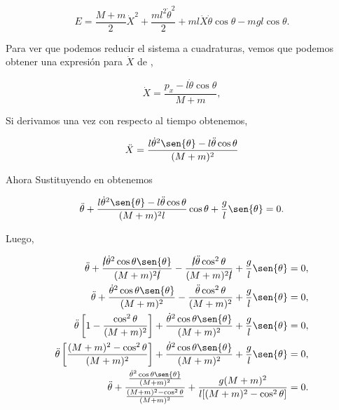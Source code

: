 \documentclass[a4paper,10pt]{article}
\numberwithin{equation}{section}
\begin{document}
\begin{equation}
  E = \frac{M+m}{2}\dot{X}^2 + \frac{ml^2 \dot{\theta}^2}{2} + 
    ml\dot{X}\dot{\theta}\cos{\theta} - mgl \cos{\theta}.
    \label{eq:pendu9}
\end{equation}

Para ver que podemos reducir el sistema a cuadraturas, vemos que podemos obtener 
una expresión para $\dot{X}$ de ,

\begin{equation}
 \dot{X} = \frac{p_x - l\dot{\theta}\cos{\theta}}{M+m},
 \label{eq:pendu10}
\end{equation}

Si derivamos una vez  con respecto al tiempo obtenemos,

\begin{equation}
 \ddot{X} = \frac{l\dot{\theta}^2\sen{\theta} - l\ddot{\theta}\cos{\theta}}{(M+m)^2}
 \label{eq:pendu11}
 \end{equation}

Ahora Sustituyendo  en  obtenemos

\begin{equation}
 \ddot{\theta}  + \frac{l\dot{\theta}^2\sen{\theta} - l\ddot{\theta}\cos{\theta}}{(M+m)^2l}\cos{\theta} + \frac{g}{l}\sen{\theta} = 0.
\end{equation}

Luego,

\begin{align*}
 \ddot{\theta} + \frac{\cancel{l}\dot{\theta}^2\cos{\theta}\sen{\theta}}{(M+m)^2\cancel{l}} - \frac{\cancel{l}\ddot{\theta}\cos^2{\theta}}{(M+m)^2\cancel{l}}
 + \frac{g}{l}\sen{\theta} = 0, \\
 \ddot{\theta} + \frac{\dot{\theta}^2\cos{\theta}\sen{\theta}}{(M+m)^2} - \frac{\ddot{\theta}\cos^2{\theta}}{(M+m)^2}
 + \frac{g}{l}\sen{\theta} = 0, \\
 \ddot{\theta}\left[1 - \frac{\cos^2{\theta}}{(M+m)^2} \right] + \frac{\dot{\theta}^2\cos{\theta}\sen{\theta}}{(M+m)^2}
 + \frac{g}{l}\sen{\theta} = 0, \\
\ddot{\theta}\left[\frac{(M+m)^2 - \cos^2{\theta}}{(M+m)^2} \right]+ \frac{\dot{\theta}^2\cos{\theta}\sen{\theta}}{(M+m)^2}
 + \frac{g}{l}\sen{\theta} = 0, \\
 \ddot{\theta} + \frac{\frac{\dot{\theta}^2\cos{\theta}\sen{\theta}}{(M+m)^2}}{\frac{(M+m)^2 - \cos^2{\theta}}{(M+m)^2}}
 + \frac{g(M+m)^2}{l[(M+m)^2-\cos^2{\theta}]} = 0.
\end{align*}
\end{document}

